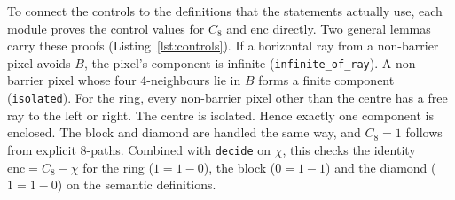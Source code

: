 \documentclass[11pt]{article}
\theoremstyle{definition}
\theoremstyle{remark}
\begin{document}
To connect the controls to the definitions that the statements actually use, each
module proves the control values for $C_8$ and $\mathrm{enc}$ directly. Two
general lemmas carry these proofs (Listing~\ref{lst:controls}). If a horizontal
ray from a non-barrier pixel avoids $B$, the pixel's component is infinite
(\texttt{infinite\_of\_ray}). A non-barrier pixel whose four 4-neighbours lie in
$B$ forms a finite component (\texttt{isolated}). For the ring, every non-barrier
pixel other than the centre has a free ray to the left or right. The centre is
isolated. Hence exactly one component is enclosed. The block and diamond are
handled the same way, and $C_8=1$ follows from explicit 8-paths. Combined with
\texttt{decide} on $\chi$, this checks the identity $\mathrm{enc}=C_8-\chi$ for
the ring ($1=1-0$), the block ($0=1-1$) and the diamond ($1=1-0$) on the
semantic definitions.
\end{document}
